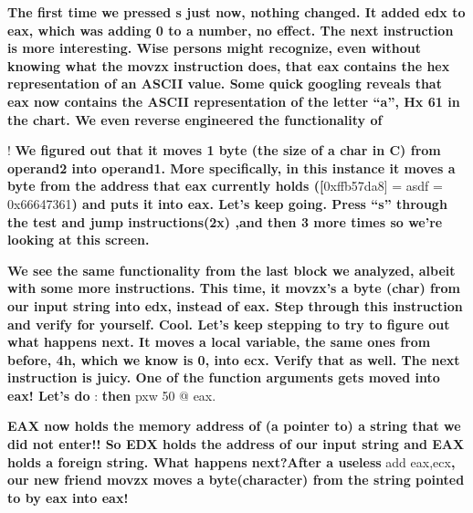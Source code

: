 \documentclass[letterpaper]{article}
\newcommand{\sitfig}[3]{
\begin{figure}[H]
\centering
\makebox[\textwidth][c]{
#2
}
\label{#1}
\end{figure}
}
\newcommand{\sitgfx}[4][scale=1.0]{
\sitfig{#3}{\texttt{[image: \#2]}}{#4}
}
\begin{document}
  
\sitgfx[width=6.5in,height=2.5138in]{reversing-img036.png}{fig:unk}{TODO CAPTION}
\textbf{The first time we pressed s just now, nothing changed. It added edx to eax, which was adding 0 to a number, no
effect. The next instruction is more interesting. Wise persons might recognize, even without knowing what the movzx
instruction does, that eax contains the hex representation of an ASCII value. Some quick googling reveals that eax now
contains the ASCII representation of the letter ``a'', Hx 61 in the chart. We even reverse engineered the functionality
of }  
\sitgfx[width=6.3543in,height=0.2291in]{reversing-img037.png}{fig:unk}{TODO CAPTION}
 !\newline
\textbf{We figured out that it moves 1 byte (the size of a char in C) from operand2 into operand1.  More specifically,
in this instance it moves a byte from the address that eax currently holds ([}0xffb57da8] = asdf = 0x66647361\textbf{)
and puts it into eax. Let's keep going. Press ``s'' through the test and jump instructions(2x) ,and then 3 more times
so we're looking at this screen.}  
\sitgfx[width=6.5in,height=1.8335in]{reversing-img038.png}{fig:unk}{TODO CAPTION}
 

\begin{center}
 
  \sitgfx[width=1.6043in,height=4.9272in]{reversing-img039.png}{fig:unk}{TODO CAPTION}

\end{center}
\textbf{We see the same functionality from the last block we analyzed, albeit with some more instructions. This time, it
movzx's a byte (char) from our input string into edx, instead of eax. Step through this instruction and verify for
yourself.\newline
Cool. Let's keep stepping to try to figure out what happens next. It moves a local variable, the same ones from before,
4h, which we know is 0, into ecx. Verify that as well. The next instruction is juicy. One of the function arguments
gets moved into eax! Let's do} : \textbf{then }pxw 50 @ eax.   
\sitgfx[width=6.5in,height=4.5138in]{reversing-img040.png}{fig:unk}{TODO CAPTION}
 

\begin{center}
 
  \sitgfx[width=1.8543in,height=0.2189in]{reversing-img041.png}{fig:unk}{TODO CAPTION}

\end{center}
\textbf{EAX now holds the memory address of (a pointer to) a string that we did not enter!! So EDX holds the address of
our input string and EAX holds a foreign string. What happens next?After a useless }add eax,ecx\textbf{, our new friend
movzx moves a byte(character) from the string pointed to by eax into eax! }  
\sitgfx[width=6.5in,height=2.0555in]{reversing-img042.png}{fig:unk}{TODO CAPTION}
 
\end{document}
